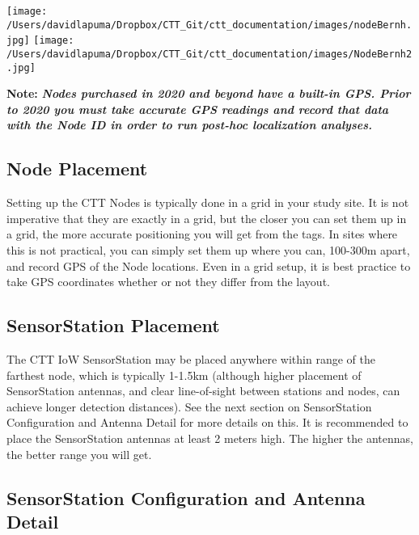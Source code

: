 \documentclass[
]{article}
\begin{document}
\texttt{[image: /Users/davidlapuma/Dropbox/CTT\_Git/ctt\_documentation/images/nodeBernh.jpg]}
\texttt{[image: /Users/davidlapuma/Dropbox/CTT\_Git/ctt\_documentation/images/NodeBernh2.jpg]}

\textbf{Note:} \textbf{\emph{Nodes purchased in 2020 and beyond have a
built-in GPS. Prior to 2020 you must take accurate GPS readings and
record that data with the Node ID in order to run post-hoc localization
analyses.}}

\hypertarget{node-placement}{%
\subsection{Node Placement}\label{node-placement}}

Setting up the CTT Nodes is typically done in a grid in your study site.
It is not imperative that they are exactly in a grid, but the closer you
can set them up in a grid, the more accurate positioning you will get
from the tags. In sites where this is not practical, you can simply set
them up where you can, 100-300m apart, and record GPS of the Node
locations. Even in a grid setup, it is best practice to take GPS
coordinates whether or not they differ from the layout.

\hypertarget{sensorstation-placement}{%
\subsection{SensorStation Placement}\label{sensorstation-placement}}

The CTT IoW SensorStation may be placed anywhere within range of the
farthest node, which is typically 1-1.5km (although higher placement of
SensorStation antennas, and clear line-of-sight between stations and
nodes, can achieve longer detection distances). See the next section on
SensorStation Configuration and Antenna Detail for more details on this.
It is recommended to place the SensorStation antennas at least 2 meters
high. The higher the antennas, the better range you will get.

\hypertarget{sensorstation-configuration-and-antenna-detail}{%
\subsection{SensorStation Configuration and Antenna
Detail}\label{sensorstation-configuration-and-antenna-detail}}
\end{document}
